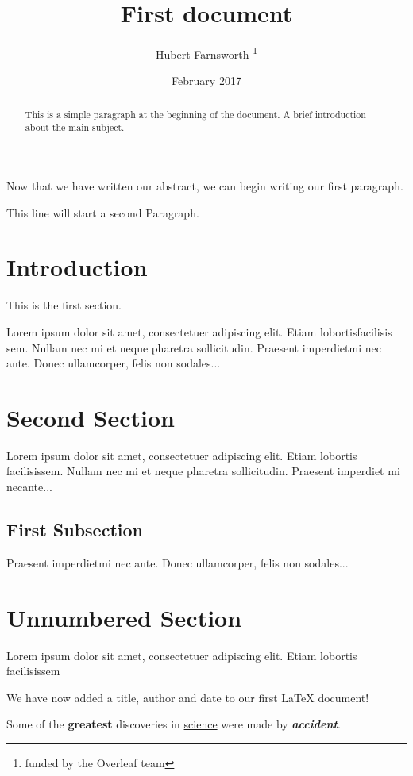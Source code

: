 \documentclass[12pt, letterpaper, twoside]{article}
\title{First document}
\author{Hubert Farnsworth \thanks{funded by the Overleaf team}}
\date{February 2017}
\begin{document}
\maketitle
\tableofcontents

\begin{abstract}
This is a simple paragraph at the beginning of the 
document. A brief introduction about the main subject.
\end{abstract}

Now that we have written our abstract, we can begin writing our first paragraph.
 
This line will start a second Paragraph.

\section{Introduction}
 
This is the first section.
 
Lorem  ipsum  dolor  sit  amet,  consectetuer  adipiscing  
elit.   Etiam  lobortisfacilisis sem.  Nullam nec mi et 
neque pharetra sollicitudin.  Praesent imperdietmi nec ante. 
Donec ullamcorper, felis non sodales...
 
\section{Second Section}
 
Lorem ipsum dolor sit amet, consectetuer adipiscing elit.  
Etiam lobortis facilisissem.  Nullam nec mi et neque pharetra 
sollicitudin.  Praesent imperdiet mi necante...
 
\subsection{First Subsection}
Praesent imperdietmi nec ante. Donec ullamcorper, felis non sodales...
 
\section*{Unnumbered Section}
Lorem ipsum dolor sit amet, consectetuer adipiscing elit.  
Etiam lobortis facilisissem

We have now added a title, author and date to our first \LaTeX{} document!

Some of the \textbf{greatest}
discoveries in \underline{science} 
were made by \textbf{\textit{accident}}.
\end{document}
